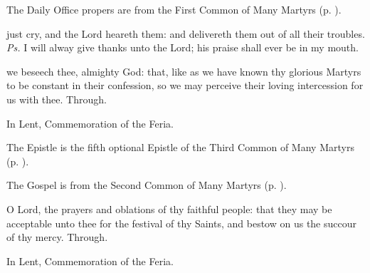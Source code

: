 \begin{rubric}
	The Daily Office propers are from the First Common of Many Martyrs (p. \pageref{CommonMartyrsI}).
\end{rubric}

\introit
{} just cry, and the Lord heareth them: and delivereth them out of all their troubles. \textit{Ps.} I will alway give thanks unto the Lord; his praise shall ever be in my mouth.

\collect
{} we beseech thee, almighty God: that, like as we have known thy glorious Martyrs to be constant in their confession, so we may perceive their loving intercession for us with thee. Through.

\begin{rubric}
	In Lent, Commemoration of the Feria.
\end{rubric}

\begin{rubric}
	The Epistle is the fifth optional Epistle of the Third Common of Many Martyrs (p. \pageref{Hebrews1133}).
\end{rubric}


\begin{rubric}
	The Gospel is from the Second Common of Many Martyrs (p. \pageref{CommonMartyrsII}).
\end{rubric}


\secret
{} O Lord, the prayers and oblations of thy faithful people: that they may be acceptable unto thee for the festival of thy Saints, and bestow on us the succour of thy mercy. Through.

\begin{rubric}
	In Lent, Commemoration of the Feria.
\end{rubric}


